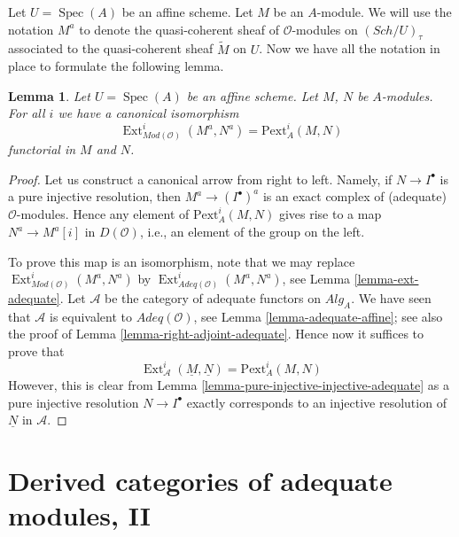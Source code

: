 \documentclass{stacks-project}
\theoremstyle{plain}
\newtheorem{lemma}[subsection]{Lemma}
\theoremstyle{definition}
\theoremstyle{remark}
\numberwithin{equation}{subsection}
\def\Spec{\mathop{\mathrm{Spec}}}
\def\Ext{\mathop{\mathrm{Ext}}\nolimits}
\def\Sch{\mathit{Sch}}
\begin{document}
\noindent
Let $U = \Spec(A)$ be an affine scheme. Let $M$ be an $A$-module.
We will use the notation $M^a$ to denote the quasi-coherent sheaf
of $\mathcal{O}$-modules on $(\Sch/U)_\tau$ associated to
the quasi-coherent sheaf $\widetilde{M}$ on $U$.
Now we have all the notation in place to formulate the following lemma.

\begin{lemma}
\label{lemma-big-ext}
Let $U = \Spec(A)$ be an affine scheme. Let $M$, $N$ be $A$-modules.
For all $i$ we have a canonical isomorphism
$$
\Ext^i_{\textit{Mod}(\mathcal{O})}(M^a, N^a) = \text{Pext}^i_A(M, N)
$$
functorial in $M$ and $N$.
\end{lemma}

\begin{proof}
Let us construct a canonical arrow from right to left. Namely, if
$N \to I^\bullet$ is a pure injective resolution, then
$M^a \to (I^\bullet)^a$ is an exact complex of (adequate)
$\mathcal{O}$-modules. Hence any element of $\text{Pext}^i_A(M, N)$
gives rise to a map $N^a \to M^a[i]$ in $D(\mathcal{O})$, i.e.,
an element of the group on the left.

\medskip\noindent
To prove this map is an isomorphism, note that we may replace
$\Ext^i_{\textit{Mod}(\mathcal{O})}(M^a, N^a)$ by
$\Ext^i_{\textit{Adeq}(\mathcal{O})}(M^a, N^a)$, see
Lemma \ref{lemma-ext-adequate}.
Let $\mathcal{A}$ be the category of adequate functors
on $\textit{Alg}_A$. We have seen that $\mathcal{A}$ is
equivalent to $\textit{Adeq}(\mathcal{O})$, see
Lemma \ref{lemma-adequate-affine}; see also the proof of
Lemma \ref{lemma-right-adjoint-adequate}.
Hence now it suffices to prove that
$$
\Ext^i_\mathcal{A}(\underline{M}, \underline{N}) =
\text{Pext}^i_A(M, N)
$$
However, this is clear from
Lemma \ref{lemma-pure-injective-injective-adequate}
as a pure injective resolution $N \to I^\bullet$ exactly corresponds
to an injective resolution of $\underline{N}$ in $\mathcal{A}$.
\end{proof}







\section{Derived categories of adequate modules, II}
\label{section-derived-categories}
\end{document}

